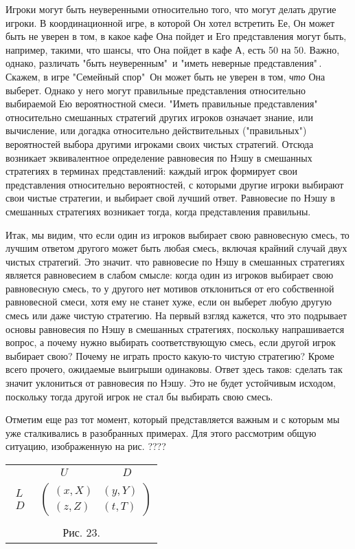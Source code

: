 {Игроки могут быть неуверенными относительно того, что могут делать
другие игроки. В координационной игре, в которой Он хотел встретить
Ее, Он может быть не уверен в том, в какое кафе Она пойдет и Его
представления могут быть, например, такими, что шансы, что Она
пойдет в кафе А, есть 50 на 50. Важно, однако, различать "быть
неуверенным"\, и "иметь неверные представления"\,. Скажем, в игре
"Семейный спор"\, Он может быть не уверен в том, \emph{что} Она
выберет. Однако у него могут правильные представления относительно
выбираемой Ею вероятностной смеси. "Иметь правильные
представления"\, относительно смешанных стратегий других игроков
означает знание, или вычисление, или догадка относительно
действительных ("правильных") вероятностей выбора другими игроками
своих чистых стратегий. Отсюда возникает эквивалентное определение
равновесия по Нэшу в смешанных стратегиях в терминах представлений:
каждый игрок формирует свои представления относительно вероятностей,
с которыми другие игроки выбирают свои чистые стратегии, и выбирает
свой лучший ответ. Равновесие по Нэшу в смешанных стратегиях
возникает тогда, когда представления правильны.

Итак, мы видим, что если один из игроков выбирает свою равновесную
смесь, то лучшим ответом другого может быть любая смесь, включая
крайний случай двух чистых стратегий. Это значит. что равновесие
по Нэшу в смешанных стратегиях является равновесием в слабом смысле:
когда один из игроков выбирает свою равновесную смесь, то у другого
нет мотивов отклониться от его собственной равновесной смеси, хотя
ему не станет хуже, если он выберет любую другую смесь или даже чистую
стратегию. На первый взгляд кажется, что это подрывает основы
равновесия по Нэшу в смешанных стратегиях, поскольку напрашивается
вопрос, а почему нужно выбирать соответствующую смесь, если
другой игрок выбирает свою? Почему не играть просто какую-то
чистую стратегию? Кроме всего прочего, ожидаемые выигрыши одинаковы.
Ответ здесь таков: сделать так значит уклониться от равновесия по Нэшу.
Это не будет устойчивым исходом, поскольку тогда другой игрок не стал
бы выбирать свою смесь.

Отметим еще раз тот момент, который представляется важным и с которым
мы уже сталкивались в разобранных примерах. Для этого рассмотрим
общую ситуацию, изображенную на рис. ????

\begin{center}
\begin{tabular}{cc}
&$\begin{array}{cc} U\qquad&\qquad\, D\end{array}$\\
$\begin{array}{c} L\\ D\end{array}$& $\left(\begin{array}{cc}
(x,X)& (y,Y)\\
(z,Z)&(t,T)\end{array}\right)$\\
\multicolumn{2}{c}{}\\
\multicolumn{2}{c}{Рис. 23.}\\
\end{tabular}
\end{center}

}
